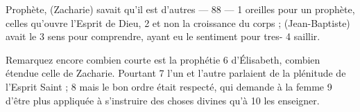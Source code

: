 Prophète, (Zacharie) savait qu'il est d'autres	 
 	--- 88 ---	 
1	 	oreilles pour un prophète, celles qu'ouvre l'Esprit de Dieu,	 
2	 	et non la croissance du corps ; (Jean-Baptiste) avait le	 
3	 	sens pour comprendre, ayant eu le sentiment pour tres-	 
4	 	saillir.

Remarquez encore combien courte est la prophétie	 
6	 	d'Élisabeth, combien étendue celle de Zacharie. Pourtant	 
7	 	l'un et l'autre parlaient de la plénitude de l'Esprit Saint ;	 
8	 	mais le bon ordre était respecté, qui demande à la femme	 
9	 	d'être plus appliquée à s'instruire des choses divines qu'à	 
10	 	les enseigner.